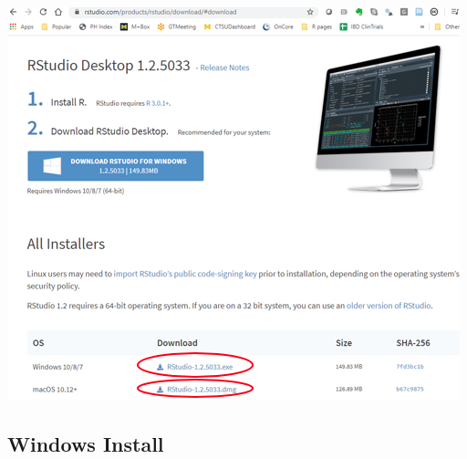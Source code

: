 \documentclass[
]{book}
\begin{document}
\includegraphics{images/rstudio_mac_win.png}

\hypertarget{windows-install}{%
\subsection{Windows Install}\label{windows-install}}
\end{document}
